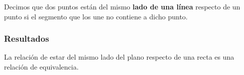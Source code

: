 
\begin{defin*}
	Decimos que dos puntos están del mismo \textbf{lado de una línea} respecto de
	un punto si el segmento que los une no contiene a dicho punto.
\end{defin*}



\subsubsection{Resultados}%




\begin{prop}
	La relación de estar del mismo lado del plano respecto de una recta es una
	relación de equivalencia.
\end{prop}























